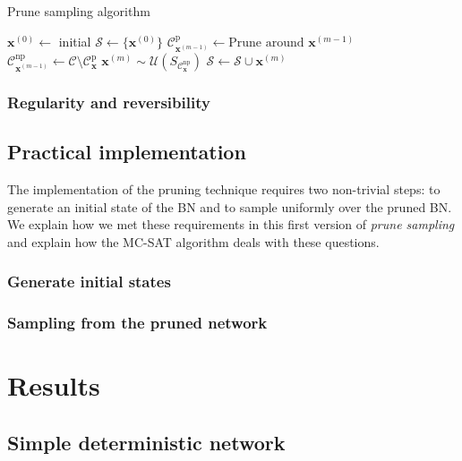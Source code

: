 \documentclass[a4paper, twoside, 11pt]{report}
\newcommand{\bfx}{{\mathbf{x}}}
\newcommand{\C}{{\mathcal C}}
\theoremstyle{plain}
\theoremstyle{definition}
\theoremstyle{remark}
\newcommand{\U}{{\mathcal{U}}}
\newcommand{\ps}{\textit{prune sampling }}
\begin{document}
\begin{algorithm}[h!]
\renewcommand\thealgorithm{1}
\caption{Prune sampling algorithm}
\label{prunealg}
\begin{algorithmic}
\State $\mathbf{x}^{(0)} \gets $ initial
     \State $\mathcal{S} \gets \{\mathbf{x}^{(0)}\}$
     \State $\C_{\bfx^{(m-1)}}^{\text{p}} \gets \text{Prune around } \mathbf{x}^{(m-1)}$ \\ 
	\State $\C_{\bfx^{(m-1)}}^{\text{np}} \gets \mathcal{C} \setminus \C_\bfx^{\text{p}}$  
     \State $\mathbf{x}^{(m)} \sim  \U(S_{\C_\bfx^{\text{np}}}) $ 
     \State $\mathcal{S} \gets \mathcal{S} \cup \mathbf{x}^{(m)}$
     \EndFor
     \State {}
\EndFunction
\end{algorithmic}
\end{algorithm}



\subsection{Regularity and reversibility}

\section{Practical implementation}
The implementation of the pruning technique requires two non-trivial steps: to generate an initial state of the BN and to sample uniformly over the pruned BN. We explain how we met these requirements in this first version of \ps and explain how the MC-SAT algorithm deals with these questions.
\subsection{Generate initial states}
\subsection{Sampling from the pruned network}

\chapter{Results}

\section{Simple deterministic network}
\end{document}
